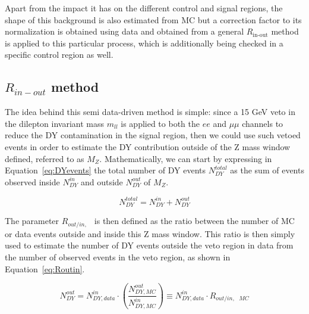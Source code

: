 \documentclass[a4paper, 10pt, openright]{report}
\begin{document}
Apart from the impact it has on the different control and signal regions, the shape of this background is also estimated from \ac{MC} but a correction factor to its normalization is obtained using data and obtained from a general $R_{\text{in-out}}$ method is applied to this particular process, which is additionally being checked in a specific control region as well.

\subsection{\boldmath$R_{in-out}$ method} \label{subsection:rinout}

The idea behind this semi data-driven method is simple: since a 15 GeV veto in the dilepton invariant mass $m_{ll}$ is applied to both the $ee$ and $\mu \mu$ channels to reduce the \ac{DY} contamination in the signal region, then we could use such vetoed events in order to estimate the \ac{DY} contribution outside of the Z mass window defined, referred to as $M_Z$. Mathematically, we can start by expressing in Equation~\ref{eq:DYevents} the total number of \ac{DY} events $N_{DY}^{total}$ as the sum of events observed inside $N_{DY}^{in}$ and outside $N_{DY}^{out}$ of $M_Z$.

\begin{equation}
\label{eq:DYevents}
N_{DY}^{total} = N_{DY}^{in} + N_{DY}^{out}
\end{equation}

The parameter $R_{out/in,\text{ }}$ is then defined as the ratio between the number of \ac{MC} or data events outside and inside this Z mass window. This ratio is then simply used to estimate the number of DY events outside the veto region in data from the number of observed events in the veto region, as shown in Equation~\ref{eq:Routin}.

\begin{equation}
\label{eq:Routin}
N^{out}_{DY} = N^{in}_{DY, data} \cdot \left (\frac{N^{out}_{DY, MC}}{N^{in}_{DY, MC}} \right ) \equiv  N^{in}_{DY, data} \cdot R_{out/in,\text{ } MC}
\end{equation}
\end{document}
